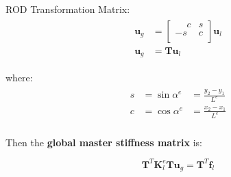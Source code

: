 \documentclass[10pt,b5paper,titlepage]{book}
\newcommand{\m}{\mathbf}
\newenvironment{eqarray}
{
    \begin{eqnarray}
        \begin{aligned}
}
{
        \end{aligned}
    \end{eqnarray}
}
\begin{document}
ROD Transformation Matrix:
\begin{eqarray}
    \m{u}_g &=
    \begin{bmatrix}
        \phantom{-}c & s \\
        -s & c \\
    \end{bmatrix} \m{u}_l \\
    \m{u}_g &= \m{T} \m{u}_l
\end{eqarray}

where:
\begin{eqarray}
    s &= \sin \alpha^e &= \frac{y_2 - y_1}{L^e} \\
    c &= \cos \alpha^e &= \frac{x_2 - x_1}{L^e} \\
\end{eqarray}

Then the \textbf{global master stiffness matrix} is:

\begin{equation}
    \m{T}^T \m{K}_l^e \m{T} \m{u}_g = \m{T}^T \m{f}_l
\end{equation}
\end{document}
